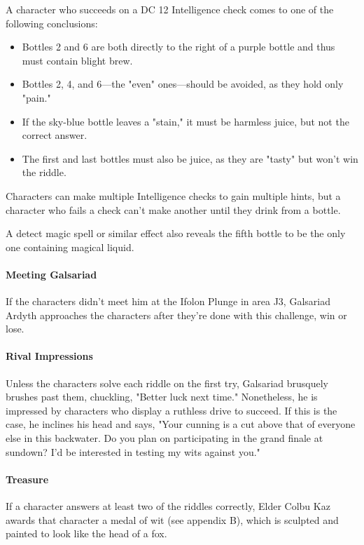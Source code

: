 \documentclass[10pt,a4paper,twoside,twocolumn,openany,nodeprecatedcode]{dndbook}
\begin{document}
A character who succeeds on a DC 12 Intelligence check comes to one of the following conclusions:


\begin{itemize}
\item Bottles 2 and 6 are both directly to the right of a purple bottle and thus must contain blight brew.
\item Bottles 2, 4, and 6—the "even" ones—should be avoided, as they hold only "pain."
\item If the sky-blue bottle leaves a "stain," it must be harmless juice, but not the correct answer.
\item The first and last bottles must also be juice, as they are "tasty" but won't win the riddle.
\end{itemize}

Characters can make multiple Intelligence checks to gain multiple hints, but a character who fails a check can't make another until they drink from a bottle.

A detect magic spell or similar effect also reveals the fifth bottle to be the only one containing magical liquid.

\paragraph{Meeting Galsariad}
If the characters didn't meet him at the Ifolon Plunge in area J3, Galsariad Ardyth approaches the characters after they're done with this challenge, win or lose.

\paragraph{Rival Impressions}
Unless the characters solve each riddle on the first try, Galsariad brusquely brushes past them, chuckling, "Better luck next time." Nonetheless, he is impressed by characters who display a ruthless drive to succeed. If this is the case, he inclines his head and says, "Your cunning is a cut above that of everyone else in this backwater. Do you plan on participating in the grand finale at sundown? I'd be interested in testing my wits against you."

\paragraph{Treasure}
If a character answers at least two of the riddles correctly, Elder Colbu Kaz awards that character a medal of wit (see appendix B), which is sculpted and painted to look like the head of a fox.
\end{document}
